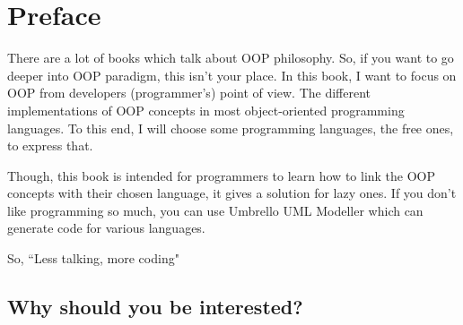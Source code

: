 \documentclass[12pt]{book}
\begin{document}
	\chapter*{Preface}
\fi

There are a lot of books which talk about OOP philosophy.
So, if you want to go deeper into OOP paradigm, this isn't your place.
In this book, I want to focus on OOP from developers (programmer's) point of view.
The different implementations of OOP concepts in most object-oriented programming languages.
To this end, I will choose some programming languages, the free ones, to express that.

Though, this book is intended for programmers to learn how to link the OOP concepts with their chosen language, it gives a solution for lazy ones.
If you don't like programming so much, you can use Umbrello UML Modeller which can generate code for various languages.

\vfill
\begin{flushright}
So, ``Less talking, more coding"
\end{flushright}

\newpage

\section*{Why should you be interested?}
\end{document}
